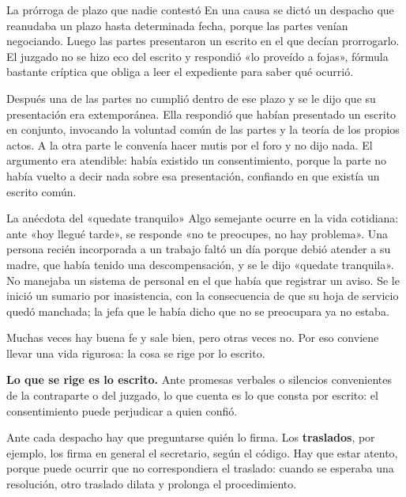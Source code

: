 \documentclass[12pt,oneside]{book}
\begin{document}
\begin{example}{La prórroga de plazo que nadie contestó}
En una causa se dictó un despacho que reanudaba un plazo hasta determinada fecha, porque las partes venían negociando. Luego las partes presentaron un escrito en el que decían prorrogarlo. El juzgado no se hizo eco del escrito y respondió «lo proveído a fojas», fórmula bastante críptica que obliga a leer el expediente para saber qué ocurrió.

Después una de las partes no cumplió dentro de ese plazo y se le dijo que su presentación era extemporánea. Ella respondió que habían presentado un escrito en conjunto, invocando la voluntad común de las partes y la teoría de los propios actos. A la otra parte le convenía hacer mutis por el foro y no dijo nada. El argumento era atendible: había existido un consentimiento, porque la parte no había vuelto a decir nada sobre esa presentación, confiando en que existía un escrito común.
\end{example}

\begin{example}{La anécdota del «quedate tranquilo»}
Algo semejante ocurre en la vida cotidiana: ante «hoy llegué tarde», se responde «no te preocupes, no hay problema». Una persona recién incorporada a un trabajo faltó un día porque debió atender a su madre, que había tenido una descompensación, y se le dijo «quedate tranquila». No manejaba un sistema de personal en el que había que registrar un aviso. Se le inició un sumario por inasistencia, con la consecuencia de que su hoja de servicio quedó manchada; la jefa que le había dicho que no se preocupara ya no estaba.

Muchas veces hay buena fe y sale bien, pero otras veces no. Por eso conviene llevar una vida rigurosa: la cosa se rige por lo escrito.
\end{example}

\begin{important}
\textbf{Lo que se rige es lo escrito.} Ante promesas verbales o silencios convenientes de la contraparte o del juzgado, lo que cuenta es lo que consta por escrito: el consentimiento puede perjudicar a quien confió.
\end{important}

Ante cada despacho hay que preguntarse quién lo firma. Los \textbf{traslados}, por ejemplo, los firma en general el secretario, según el código. Hay que estar atento, porque puede ocurrir que no correspondiera el traslado: cuando se esperaba una resolución, otro traslado dilata y prolonga el procedimiento.
\end{document}
